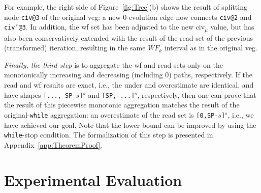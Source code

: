 \documentclass{sig-alternate}
\begin{document}
For example, the right side of Figure~\ref{fig:Tree}(b) shows the result of
splitting  node {\tt civ@3} of the original {\sc veg}: a new $0$-evolution
edge now connects {\tt civ@2} and {\tt civ'@3}. In addition, the {\sc wf} set 
has been adjusted to the new {\sc civ}$_\mu$ value, but has also
been conservatively extended with the result of the read-set of the previous
(transformed) iteration, resulting in the same $WF_k$ interval as 
in the original {\sc veg}. 



{\em Finally, the third step} is to aggregate the {\sc wf} and read sets 
only on the monotonically increasing and decreasing (including $0$) paths,
respectively. 
If the read and {\sc wf} results are exact, i.e., the under 
and overestimate are identical, and have shapes {\tt [..., SP-$s$]$^s$}  
and {\tt[SP, ...]$^s$}, respectively, then 
one can prove that the result of this piecewise monotonic
aggregation matches the result of the original-{\tt while} aggregation:
an overestimate of the 
read set is {\tt [0,SP-$s$]$^s$}, i.e., 
we have achieved our goal. 
Note that the lower bound can be improved by using the {\tt while}-stop condition. 
The formalization of this step is presented in Appendix~\ref{app:TheoremProof}. 


\section{Experimental Evaluation}
\label{sec:EmpEval}
\end{document}
